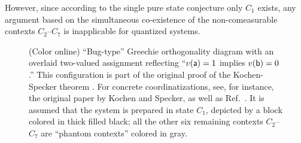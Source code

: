 \documentclass[%
  preprint,
 showpacs,
 showkeys,
 preprintnumbers,
 amsmath,amssymb,
 aps,
   pra,
  longbibliography,
 ]{revtex4-1}
\begin{document}
However, since according to  the  single pure state conjecture
only $C_1$ exists, any argument based on the simultaneous co-existence of the
non-comeasurable contexts $C_2$--$C_7$ is inapplicable for quantized systems.
\begin{figure}[h]
\begin{center}
\end{center}
\caption{(Color online)
``Bug-type'' \cite{Specker-priv} Greechie orthogonality diagram
with an overlaid two-valued assignment reflecting ``$v({\textsf a})=1$ implies $v({\textsf b})=0$.''
This configuration is part of the original
proof of the Kochen-Specker theorem \cite[$\Gamma_1$]{kochen1}.
For concrete coordinatizations, see, for instance, the original paper by Kochen and Specker, as well as Ref.~\cite{svozil-tkadlec,2012-incomput-proofsCJ}.
It is assumed that the system is prepared in state $C_1$, depicted by a block colored in thick filled black;
all the other six remaining contexts $C_2$--$C_7$ are   ``phantom contexts'' colored in gray.
}
\label{2012-psiqm-v2-f2}
\end{figure}
\end{document}
